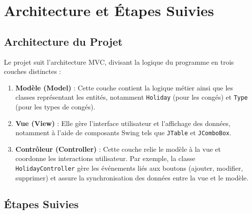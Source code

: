 \documentclass[a4paper,12pt]{article}
\begin{document}
\section{Architecture et Étapes Suivies}

\subsection{Architecture du Projet}

Le projet suit l'architecture MVC, divisant la logique du programme en trois couches distinctes : \begin{enumerate} \item \textbf{Modèle (Model)} : Cette couche contient la logique métier ainsi que les classes représentant les entités, notamment \texttt{Holiday} (pour les congés) et \texttt{Type} (pour les types de congés). \item \textbf{Vue (View)} : Elle gère l'interface utilisateur et l'affichage des données, notamment à l'aide de composants Swing tels que \texttt{JTable} et \texttt{JComboBox}. \item \textbf{Contrôleur (Controller)} : Cette couche relie le modèle à la vue et coordonne les interactions utilisateur. Par exemple, la classe \texttt{HolidayController} gère les événements liés aux boutons (ajouter, modifier, supprimer) et assure la synchronisation des données entre la vue et le modèle. \end{enumerate}

\subsection{Étapes Suivies}
\end{document}
